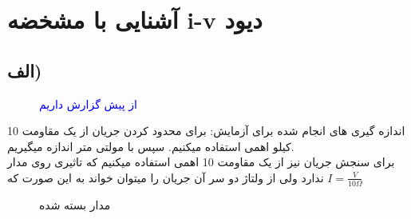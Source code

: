 \section{آشنایی با مشخضه i-v دیود}
\subsection{الف)}
\begin{figure}[h]
    \centering
    \caption{\textcolor{blue}{از پیش گزارش داریم}}
\end{figure}
اندازه گیری های انجام شده برای آزمایش:
برای محدود کردن جریان از یک مقاومت 10 کیلو اهمی استفاده میکنیم.
سپس با مولتی متر اندازه میگیریم.\\
برای سنجش جریان نیز از یک مقاومت 10 اهمی استفاده میکنیم که
تاثیری روی مدار ندارد ولی از ولتاژ دو سر آن جریان را میتوان خواند
به این صورت که $I=\frac{V}{10\Omega}$\\
\begin{figure}[!h]
    \centering
    \caption{مدار بسته شده}
\end{figure}
